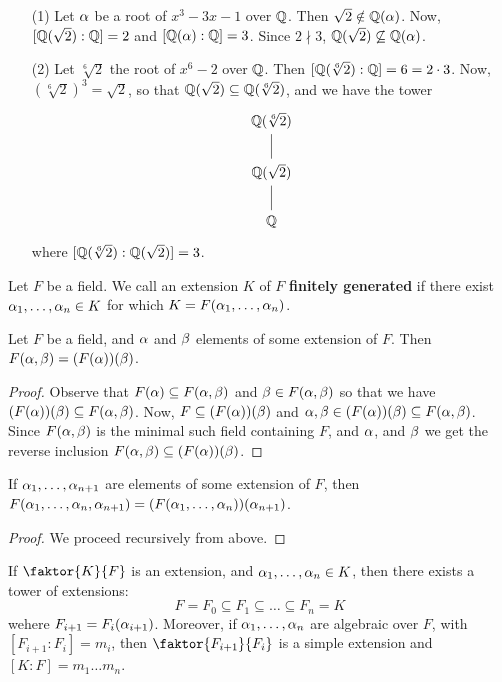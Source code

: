 \begin{example}\label{example_8.7}
  \begin{enumerate}
    \item[(1)] Let $\alpha$ be a root of $x^3-3x-1$ over $\mathbb{Q}$. Then
      $\sqrt{2} \notin \mathbb{Q}(\alpha)$. Now, $[\mathbb{Q}(\sqrt{2}):\mathbb{Q}]=2$
      and $[\mathbb{Q}(\alpha):\mathbb{Q}]=3$. Since $2 \nmid 3$, $\mathbb{Q}(\sqrt{2})
      \not\subseteq \mathbb{Q}(\alpha)$.

    \item[(2)] Let $\sqrt[6]{2}$ the root of $x^6-2$ over $\mathbb{Q}$. Then
      $[\mathbb{Q}(\sqrt[6]{2}):\mathbb{Q}]=6=2 \cdot 3$. Now,
      $(\sqrt[6]{2})^3=\sqrt{2}$, so that $\mathbb{Q}(\sqrt{2}) \subseteq
      \mathbb{Q}(\sqrt[6]{2})$, and we have the tower
      \[\begin{tikzcd}
        {\Q(\sqrt[6]{2})} \\
        {\Q(\sqrt{2})} \\
        \Q
        \arrow[no head, from=2-1, to=1-1]
        \arrow[no head, from=3-1, to=2-1]
      \end{tikzcd}\]
      where $[\mathbb{Q}(\sqrt[6]{2}):\mathbb{Q}(\sqrt{2})]=3$.
  \end{enumerate}
\end{example}

\begin{definition}
  Let $F$ be a field. We call an extension $K$ of $F$
  \textbf{finitely generated} if there exist $\alpha_1, \dots, \alpha_n \in K$
  for which $K=F(\alpha_1, \dots, \alpha_n)$.
\end{definition}

\begin{proposition}\label{proposition_8.2.6}
  Let $F$ be a field, and $\alpha$ and $\beta$ elements of some extension of
  $F$. Then $F(\alpha,\beta)=(F(\alpha))(\beta)$.
\end{proposition}
\begin{proof}
  Observe that $F(\alpha) \subseteq F(\alpha,\beta)$ and $\beta \in F(\alpha,\beta)$ so
  that we have $(F(\alpha))(\beta) \subseteq F(\alpha,\beta)$. Now, $F \subseteq
  (F(\alpha))(\beta)$ and $\alpha,\beta \in (F(\alpha))(\beta) \subseteq F(\alpha,\beta)$. Since
  $F(\alpha,\beta)$ is the minimal such field containing $F$, and $\alpha$, and
  $\beta$ we get the reverse inclusion  $F(\alpha,\beta) \subseteq (F(\alpha))(\beta)$.
\end{proof}
\begin{corollary}
  If $\alpha_1, \dots, \alpha_{n+1}$ are elements of some extension of $F$,
  then $F(\alpha_1, \dots, \alpha_n, \alpha_{n+1})=(F(\alpha_1, \dots,
  \alpha_n))(\alpha_{n+1})$.
\end{corollary}
\begin{proof}
  We proceed recursively from above.
\end{proof}
\begin{corollary}
  If $\faktor{K}{F}$ is an extension, and $\alpha_1, \dots, \alpha_n \in K$,
  then there exists a tower of extensions:
  \begin{equation*}
    F=F_0 \subseteq F_1 \subseteq \dots \subseteq F_n=K
  \end{equation*}
  wehere $F_{i+1}=F_i(\alpha_{i+1})$. Moreover, if $\alpha_1, \dots, \alpha_n$ are
  algebraic over $F$, with $[F_{i+1}:F_i]=m_i$, then
  $\faktor{F_{i+1}}{F_i}$ is a simple extension and $[K:F]=m_1 \dots
  m_n$.
\end{corollary}

